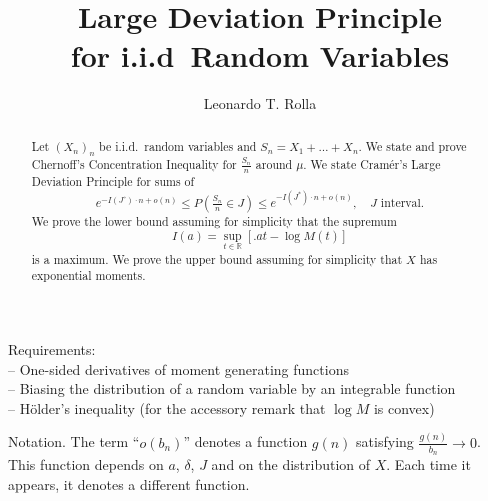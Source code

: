 \documentclass[12pt]{article}
\theoremstyle{definition}
\renewcommand{\P}{\mathbb{P}}
\newcommand{\R}{\mathbb{R}}
\renewcommand{\le}{\leqslant}
\renewcommand{\t}{t}
\renewcommand{\P}{P}
\begin{document}
\title{Large Deviation Principle \\ for i.i.d\ Random Variables}
\author{Leonardo T. Rolla}
\maketitle

{\let\thefootnote\relax
{}}

\begin{abstract}
Let $(X_n)_n$ be i.i.d.\ random variables and $S_n= X_1+\dots+X_n$.
We state and prove Chernoff's Concentration Inequality for $\frac{S_n}{n}$ around $\mu$.
We state Cramér's Large Deviation Principle for sums of
\[
e^{-I(J^\circ) \cdot n + o(n)}
\le
\P\left( \tfrac{S_n}{n} \in J \right)
\le
e^{-I(J^*) \cdot n + o(n)}
,
\quad
J \text{ interval.}
\]
We prove the lower bound assuming for simplicity that the supremum
\[
I(a)
=
\sup_{\t \in \R} \left[ \big. a\t - \log M(\t) \right]
\]
is a maximum.
We prove the upper bound assuming for simplicity that $X$ has exponential moments.
\end{abstract}


Requirements:
\\
--
One-sided derivatives of moment generating functions
\\
--
Biasing the distribution of a random variable by an integrable function
\\
--
Hölder's inequality (for the accessory remark that $\log M$ is convex)

Notation.
The term ``$o(b_n)$'' denotes a function $g(n)$ satisfying $\frac{g(n)}{b_n} \to 0$.
This function depends on $a$, $\delta$, $J$ and on the distribution of $X$.
Each time it appears, it denotes a different function.
\end{document}
